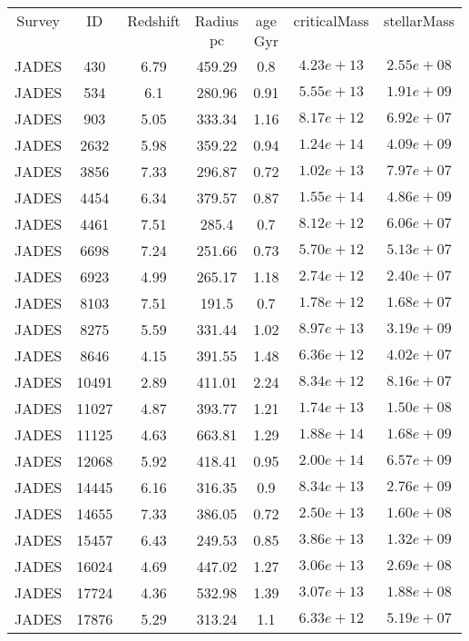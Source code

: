 \begin{table}
\begin{tabular}{ccccccc}
Survey & ID & Redshift & Radius & age & criticalMass & stellarMass \\
 &  &  & $\mathrm{pc}$ & $\mathrm{Gyr}$ &  &  \\
JADES & 430 & 6.79 & 459.29 & 0.8 & $4.23e+13$ & $2.55e+08$ \\
JADES & 534 & 6.1 & 280.96 & 0.91 & $5.55e+13$ & $1.91e+09$ \\
JADES & 903 & 5.05 & 333.34 & 1.16 & $8.17e+12$ & $6.92e+07$ \\
JADES & 2632 & 5.98 & 359.22 & 0.94 & $1.24e+14$ & $4.09e+09$ \\
JADES & 3856 & 7.33 & 296.87 & 0.72 & $1.02e+13$ & $7.97e+07$ \\
JADES & 4454 & 6.34 & 379.57 & 0.87 & $1.55e+14$ & $4.86e+09$ \\
JADES & 4461 & 7.51 & 285.4 & 0.7 & $8.12e+12$ & $6.06e+07$ \\
JADES & 6698 & 7.24 & 251.66 & 0.73 & $5.70e+12$ & $5.13e+07$ \\
JADES & 6923 & 4.99 & 265.17 & 1.18 & $2.74e+12$ & $2.40e+07$ \\
JADES & 8103 & 7.51 & 191.5 & 0.7 & $1.78e+12$ & $1.68e+07$ \\
JADES & 8275 & 5.59 & 331.44 & 1.02 & $8.97e+13$ & $3.19e+09$ \\
JADES & 8646 & 4.15 & 391.55 & 1.48 & $6.36e+12$ & $4.02e+07$ \\
JADES & 10491 & 2.89 & 411.01 & 2.24 & $8.34e+12$ & $8.16e+07$ \\
JADES & 11027 & 4.87 & 393.77 & 1.21 & $1.74e+13$ & $1.50e+08$ \\
JADES & 11125 & 4.63 & 663.81 & 1.29 & $1.88e+14$ & $1.68e+09$ \\
JADES & 12068 & 5.92 & 418.41 & 0.95 & $2.00e+14$ & $6.57e+09$ \\
JADES & 14445 & 6.16 & 316.35 & 0.9 & $8.34e+13$ & $2.76e+09$ \\
JADES & 14655 & 7.33 & 386.05 & 0.72 & $2.50e+13$ & $1.60e+08$ \\
JADES & 15457 & 6.43 & 249.53 & 0.85 & $3.86e+13$ & $1.32e+09$ \\
JADES & 16024 & 4.69 & 447.02 & 1.27 & $3.06e+13$ & $2.69e+08$ \\
JADES & 17724 & 4.36 & 532.98 & 1.39 & $3.07e+13$ & $1.88e+08$ \\
JADES & 17876 & 5.29 & 313.24 & 1.1 & $6.33e+12$ & $5.19e+07$ \\

\end{tabular}
\end{table}
